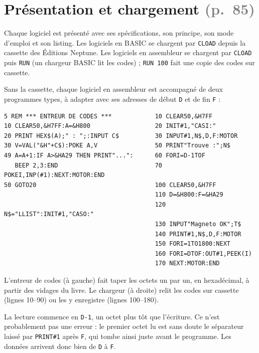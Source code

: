 \documentclass[a4paper,10pt]{article}
\newcommand{\pg}[1]{\texorpdfstring{\textcolor{gray}{\small(p.~#1)}}{}}
\begin{document}
\section{Présentation et chargement \pg{85}}

Chaque logiciel est présenté avec ses spécifications, son principe, son mode
d'emploi et son listing. Les logiciels en BASIC se chargent par
\texttt{CLOAD} depuis la cassette des Éditions Neptune. Les logiciels en
assembleur se chargent par \texttt{CLOAD} puis \texttt{RUN} (un chargeur
BASIC lit les codes) ; \texttt{RUN 100} fait une copie des codes sur
cassette.

Sans la cassette, chaque logiciel en assembleur est accompagné de deux
programmes types, à adapter avec ses adresses de début \texttt{D} et de fin
\texttt{F} :

\begin{verbatim}
5 REM *** ENTREUR DE CODES ***            10 CLEAR50,&H7FF
10 CLEAR50,&H7FF:A=&H800                  20 INIT#1,"CASI:"
20 PRINT HEX$(A);" : ";:INPUT C$          30 INPUT#1,N$,D,F:MOTOR
30 V=VAL("&H"+C$):POKE A,V                50 PRINT"Trouve :";N$
49 A=A+1:IF A>&HA29 THEN PRINT"...":      60 FORI=D-1TOF
   BEEP 2,3:END                           70 POKEI,INP(#1):NEXT:MOTOR:END
50 GOTO20                                 100 CLEAR50,&H7FF
                                          110 D=&H800:F=&HA29
                                          120 N$="LLIST":INIT#1,"CASO:"
                                          130 INPUT"Magneto OK";T$
                                          140 PRINT#1,N$,D,F:MOTOR
                                          150 FORI=1TO1800:NEXT
                                          160 FORI=DTOF:OUT#1,PEEK(I)
                                          170 NEXT:MOTOR:END
\end{verbatim}
L'entreur de codes (à gauche) fait taper les octets un par un, en
hexadécimal, à partir des vidages du livre. Le chargeur (à droite) relit les
codes sur cassette (lignes 10--90) ou les y enregistre (lignes 100--180).

La lecture commence en \texttt{D-1}, un octet plus tôt que l'écriture.
Ce n'est probablement pas une erreur : le premier octet lu est sans doute le
séparateur laissé par \texttt{PRINT\#1} après \texttt{F}, qui tombe ainsi
juste avant le programme. Les données arrivent donc bien de \texttt{D} à
\texttt{F}.
\end{document}
